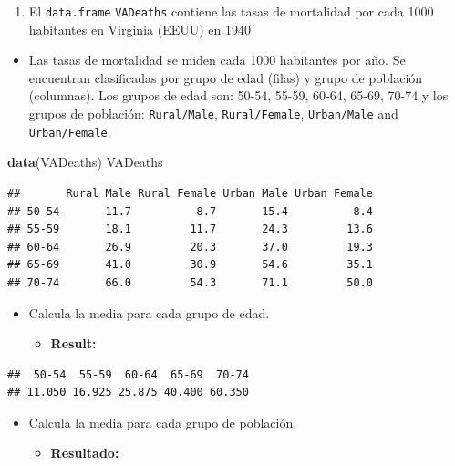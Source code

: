 \documentclass[]{book}
\newenvironment{Shaded}{\begin{snugshade}}{\end{snugshade}}
\newcommand{\KeywordTok}[1]{\textcolor[rgb]{0.13,0.29,0.53}{\textbf{#1}}}
\newcommand{\NormalTok}[1]{#1}
\providecommand{\tightlist}{%
  \setlength{\itemsep}{0pt}\setlength{\parskip}{0pt}}
\begin{document}
\begin{enumerate}
\def\labelenumi{\arabic{enumi}.}
\tightlist
\item
  El \texttt{data.frame} \texttt{VADeaths} contiene las tasas de
  mortalidad por cada 1000 habitantes en Virginia (EEUU) en 1940
\end{enumerate}

\begin{itemize}
\tightlist
\item
  Las tasas de mortalidad se miden cada 1000 habitantes por año. Se
  encuentran clasificadas por grupo de edad (filas) y grupo de población
  (columnas). Los grupos de edad son: 50-54, 55-59, 60-64, 65-69, 70-74
  y los grupos de población: \texttt{Rural/Male}, \texttt{Rural/Female},
  \texttt{Urban/Male} and \texttt{Urban/Female}.
\end{itemize}

\begin{Shaded}
\begin{Highlighting}[]
\KeywordTok{data}\NormalTok{(VADeaths)}
\NormalTok{VADeaths}
\end{Highlighting}
\end{Shaded}

\begin{verbatim}
##       Rural Male Rural Female Urban Male Urban Female
## 50-54       11.7          8.7       15.4          8.4
## 55-59       18.1         11.7       24.3         13.6
## 60-64       26.9         20.3       37.0         19.3
## 65-69       41.0         30.9       54.6         35.1
## 70-74       66.0         54.3       71.1         50.0
\end{verbatim}

\begin{itemize}
\item
  Calcula la media para cada grupo de edad.

  \begin{itemize}
  \tightlist
  \item
    \textbf{Result:}
  \end{itemize}
\end{itemize}

\begin{verbatim}
##  50-54  55-59  60-64  65-69  70-74 
## 11.050 16.925 25.875 40.400 60.350
\end{verbatim}

\begin{itemize}
\item
  Calcula la media para cada grupo de población.

  \begin{itemize}
  \tightlist
  \item
    \textbf{Resultado:}
  \end{itemize}
\end{itemize}
\end{document}
